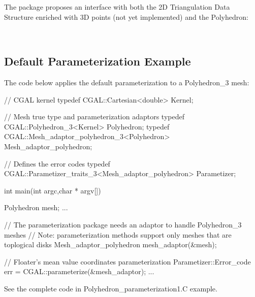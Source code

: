 The package proposes
an interface with both the 2D Triangulation Data Structure enriched
with 3D points (not yet implemented) and the Polyhedron:

  \\


\subsection{Default Parameterization Example}

The code below applies the default parameterization to a Polyhedron\_3 mesh:

\begin{ccExampleCode}

// CGAL kernel
typedef CGAL::Cartesian<double>                             Kernel;

// Mesh true type and parameterization adaptors
typedef CGAL::Polyhedron_3<Kernel>                          Polyhedron;
typedef CGAL::Mesh_adaptor_polyhedron_3<Polyhedron>         Mesh_adaptor_polyhedron;

// Defines the error codes
typedef CGAL::Parametizer_traits_3<Mesh_adaptor_polyhedron> Parametizer;

int main(int argc,char * argv[])
{
    Polyhedron mesh;
    ...

    // The parameterization package needs an adaptor to handle Polyhedron_3 meshes
    // Note: parameterization methods support only meshes that are toplogical disks
    Mesh_adaptor_polyhedron mesh_adaptor(&mesh);

    // Floater's mean value coordinates parameterization
    Parametizer::Error_code err = CGAL::parameterize(&mesh_adaptor);
    ...
}

\end{ccExampleCode}

See the complete code in Polyhedron\_parameterization1.C example.


